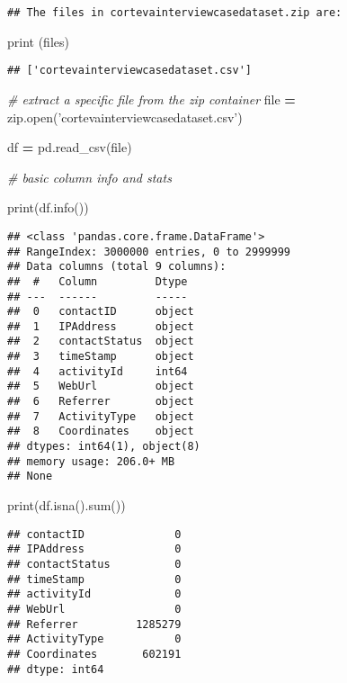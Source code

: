 \documentclass[
]{article}
\newenvironment{Shaded}{\begin{snugshade}}{\end{snugshade}}
\newcommand{\BuiltInTok}[1]{#1}
\newcommand{\CommentTok}[1]{\textcolor[rgb]{0.56,0.35,0.01}{\textit{#1}}}
\newcommand{\NormalTok}[1]{#1}
\newcommand{\OperatorTok}[1]{\textcolor[rgb]{0.81,0.36,0.00}{\textbf{#1}}}
\newcommand{\StringTok}[1]{\textcolor[rgb]{0.31,0.60,0.02}{#1}}
\begin{document}
\begin{verbatim}
## The files in cortevainterviewcasedataset.zip are:
\end{verbatim}

\begin{Shaded}
\begin{Highlighting}[]
\BuiltInTok{print}\NormalTok{ (files)}
\end{Highlighting}
\end{Shaded}

\begin{verbatim}
## ['cortevainterviewcasedataset.csv']
\end{verbatim}

\begin{Shaded}
\begin{Highlighting}[]
\CommentTok{# extract a specific file from the zip container}
\BuiltInTok{file} \OperatorTok{=} \BuiltInTok{zip}\NormalTok{.}\BuiltInTok{open}\NormalTok{(}\StringTok{'cortevainterviewcasedataset.csv'}\NormalTok{)}

\NormalTok{df }\OperatorTok{=}\NormalTok{ pd.read_csv(}\BuiltInTok{file}\NormalTok{)}

\CommentTok{# basic column info and stats}

\BuiltInTok{print}\NormalTok{(df.info())}
\end{Highlighting}
\end{Shaded}

\begin{verbatim}
## <class 'pandas.core.frame.DataFrame'>
## RangeIndex: 3000000 entries, 0 to 2999999
## Data columns (total 9 columns):
##  #   Column         Dtype 
## ---  ------         ----- 
##  0   contactID      object
##  1   IPAddress      object
##  2   contactStatus  object
##  3   timeStamp      object
##  4   activityId     int64 
##  5   WebUrl         object
##  6   Referrer       object
##  7   ActivityType   object
##  8   Coordinates    object
## dtypes: int64(1), object(8)
## memory usage: 206.0+ MB
## None
\end{verbatim}

\begin{Shaded}
\begin{Highlighting}[]
\BuiltInTok{print}\NormalTok{(df.isna().}\BuiltInTok{sum}\NormalTok{())}
\end{Highlighting}
\end{Shaded}

\begin{verbatim}
## contactID              0
## IPAddress              0
## contactStatus          0
## timeStamp              0
## activityId             0
## WebUrl                 0
## Referrer         1285279
## ActivityType           0
## Coordinates       602191
## dtype: int64
\end{verbatim}
\end{document}
